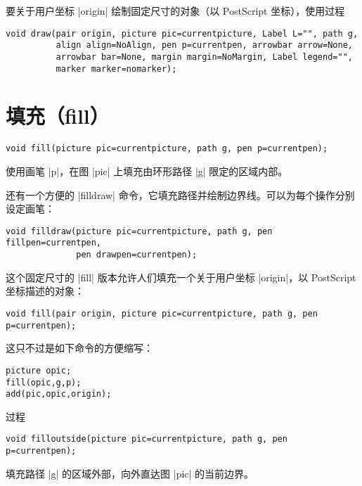 \documentclass{ctexbook}
\newcommand*\prgname[1]{\textsf{#1}}
\begin{document}
要关于用户坐标 |origin| 绘制固定尺寸的对象（以 \prgname{PostScript}
坐标），使用过程
\begin{lstlisting}
void draw(pair origin, picture pic=currentpicture, Label L="", path g,
          align align=NoAlign, pen p=currentpen, arrowbar arrow=None,
          arrowbar bar=None, margin margin=NoMargin, Label legend="",
          marker marker=nomarker);
\end{lstlisting}



\section{填充（fill）}
\label{sec:fill}

\begin{lstlisting}
void fill(picture pic=currentpicture, path g, pen p=currentpen);
\end{lstlisting}
使用画笔 |p|，在图 |pic| 上填充由环形路径 |g| 限定的区域内部。

还有一个方便的 |filldraw| 命令，它填充路径并绘制边界线。可以为每个操作分别
设定画笔：
\begin{lstlisting}
void filldraw(picture pic=currentpicture, path g, pen fillpen=currentpen,
              pen drawpen=currentpen);
\end{lstlisting}

这个固定尺寸的 |fill| 版本允许人们填充一个关于用户坐标 |origin|，以
\prgname{PostScript} 坐标描述的对象：
\begin{lstlisting}
void fill(pair origin, picture pic=currentpicture, path g, pen p=currentpen);
\end{lstlisting}
这只不过是如下命令的方便缩写：
\begin{lstlisting}
picture opic;
fill(opic,g,p);
add(pic,opic,origin);
\end{lstlisting}

过程
\begin{lstlisting}
void filloutside(picture pic=currentpicture, path g, pen p=currentpen);
\end{lstlisting}
填充路径 |g| 的区域外部，向外直达图 |pic| 的当前边界。
\end{document}
